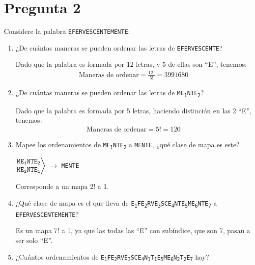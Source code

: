 \documentclass[spanish, fleqn]{article}
\begin{document}
	\section*{Pregunta 2}
	Considere la palabra \texttt{EFERVESCENTEMENTE}:
    \begin{enumerate}
    \item ¿De cuántas maneras se pueden ordenar las letras de \texttt{EFERVESCENTE}?
    
    Dado que la palabra es formada por 12 letras, y 5 de ellas son ``E'', tenemos:
    \begin{align*}
    \text{Maneras de ordenar}=\frac{12!}{5!}= 3991680
    \end{align*}
    \item ¿De cuántas maneras se pueden ordenar las letras de \texttt{ME\textsubscript{1}NTE\textsubscript{2}}?
    
    Dado que la palabra es formada por 5 letras, haciendo distinción en las 2 ``E'', tenemos:
    \begin{align*}
    \text{Maneras de ordenar}=5!= 120
    \end{align*}
    \item Mapee los ordenamientos de \texttt{ME\textsubscript{1}NTE\textsubscript{2}} a \texttt{MENTE}, ¿qué clase de mapa es este?
    
    $\left .
    \begin{matrix} 
         \texttt{ME\textsubscript{1}NTE\textsubscript{2}}\\
         \texttt{ME\textsubscript{2}NTE\textsubscript{1}}
    \end{matrix}
   \right \rangle$
   $\rightarrow$ \texttt{MENTE}    
       
    Corresponde a un mapa 2! a 1.
    \item ¿Qué clase de mapa es el que lleva de \texttt{E\textsubscript{1}FE\textsubscript{2}RVE\textsubscript{3}SCE\textsubscript{4}NTE\textsubscript{5}ME\textsubscript{6}NTE\textsubscript{7}} a  \texttt{EFERVESCENTEMENTE}?
    
    Es un mapa 7! a 1, ya que las todas las ``E'' con subíndice, que son 7, pasan a ser solo ``E''.
    
    \item ¿Cuántos ordenamientos de \texttt{E\textsubscript{1}FE\textsubscript{2}RVE\textsubscript{3}SCE\textsubscript{4}N\textsubscript{1}T\textsubscript{1}E\textsubscript{5}ME\textsubscript{6}N\textsubscript{2}T\textsubscript{2}E\textsubscript{7}} hay?
    

\end{enumerate}
\end{document}
